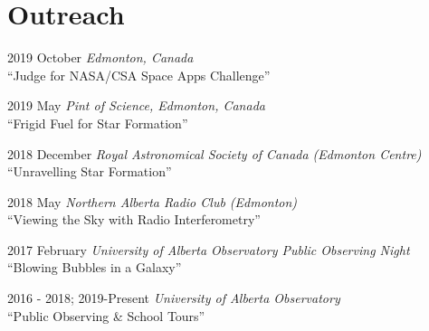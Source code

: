 \documentclass[letterpaper,11pt]{article}
\newlength{\mainindent} \setlength{\mainindent}{12pt}
\newlength{\contentindent} \setlength{\contentindent}{19ex}
\newenvironment{datelist}{
  \begingroup
  \raggedright
  \begin{description}[labelindent=\mainindent,leftmargin=\contentindent,
      style=sameline,font=\normalfont,topsep=0pt,partopsep=0pt,parsep=0pt,
      itemsep=4pt]
}{
  \end{description}
  \endgroup
}
\begin{document}



\section*{Outreach}
\begin{datelist}
\item[2019 October] \emph{Edmonton, Canada} \\ ``Judge for NASA/CSA Space Apps Challenge''
\item[2019 May] \emph{Pint of Science, Edmonton, Canada} \\ ``Frigid Fuel for Star Formation''
\item[2018 December] \emph{Royal Astronomical Society of Canada (Edmonton Centre)} \\ ``Unravelling Star Formation''
\item[2018 May] \emph{Northern Alberta Radio Club (Edmonton)} \\ ``Viewing the Sky with Radio Interferometry''
\item[2017 February] \emph{University of Alberta Observatory Public Observing Night} \\ ``Blowing Bubbles in a Galaxy''
\item[2016 - 2018; 2019-Present] \emph{University of Alberta Observatory} \\ ``Public Observing \& School Tours''
\end{datelist}
\end{document}
